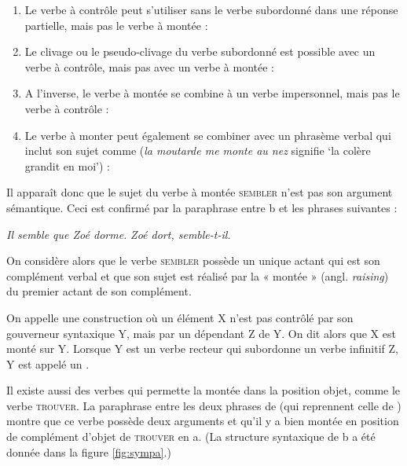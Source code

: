 \begin{enumerate}[label=(\arabic*)]
\item	Le verbe à contrôle peut s’utiliser sans le verbe subordonné dans une réponse partielle, mais pas le verbe à montée :
\ea{}
\z\z

\item	Le clivage ou le pseudo-clivage du verbe subordonné est possible avec un verbe à contrôle, mais pas avec un verbe à montée :
\ea{}
\z\z

\item	A l’inverse, le verbe à montée se combine à un verbe impersonnel, mais pas le verbe à contrôle :
\ea{}
\z\z

\item	Le verbe à monter peut également se combiner avec un phrasème verbal qui inclut son sujet comme  (\textit{la moutarde me monte au nez} signifie ‘la colère grandit en moi’) :
\ea{}
\z\z

\end{enumerate}

Il apparaît donc que le sujet du verbe à montée \textsc{sembler} n’est pas son argument sémantique. Ceci est confirmé par la paraphrase entre b et les phrases suivantes :

\ea\ea \textit{Il semble que Zoé dorme.}
\ex \textit{Zoé dort, semble-t-il.}\z\z

On considère alors que le verbe \textsc{sembler} possède un unique actant qui est son complément verbal et que son sujet est réalisé par la « montée » (angl. \textit{raising}) du premier actant de son complément. 

{On appelle  une construction où un élément X n’est pas contrôlé par son gouverneur syntaxique Y, mais par un dépendant Z de Y. On dit alors que X est monté sur Y. Lorsque Y est un verbe recteur qui subordonne un verbe infinitif Z, Y est appelé un .}

Il existe aussi des verbes qui permette la montée dans la position objet, comme le verbe \textsc{trouver}. La paraphrase entre les deux phrases de  (qui reprennent celle de ) montre que ce verbe possède deux arguments et qu’il y a bien montée en position de complément d’objet de \textsc{trouver} en a. (La structure syntaxique de b a été donnée dans la figure \ref{fig:sympa}.)

